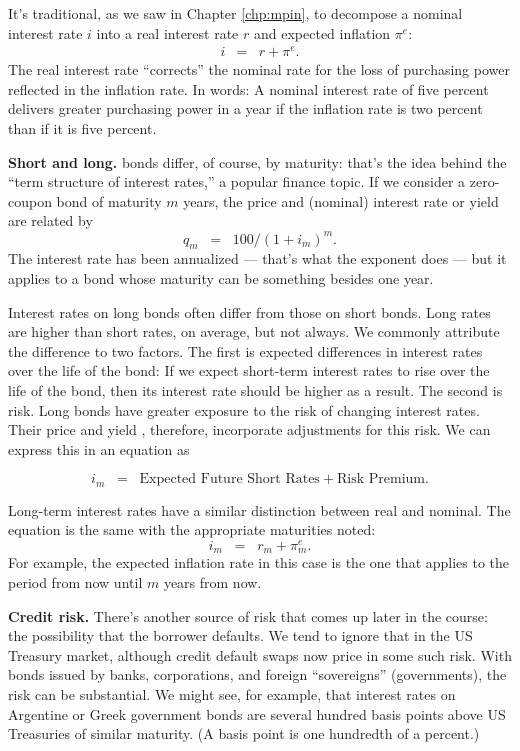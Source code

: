 It's traditional, as we saw in Chapter \ref{chp:mpin},
to decompose a nominal interest rate
 $i$
into a real interest rate
 $r$
and expected inflation $\pi^e$:
%
\begin{eqnarray}
    i &=& r + \pi^e .
    \label{eq:fisher}%
\end{eqnarray}
%
The real interest rate
``corrects'' the nominal rate for the loss of purchasing power
reflected in the inflation rate.
In words:  A nominal interest rate of five percent
delivers greater purchasing power in a year
if the inflation rate is two percent than if it is five percent.

\textbf{Short and long.}
bonds  differ, of course, by maturity:  that's
the idea behind the ``term structure of interest rates,''
a popular finance topic.
If we consider a zero-coupon bond  of maturity $m$ years,
the price and (nominal) interest rate or yield 
 are related by
\[
    q_m \;\;=\;\;  100/(1+i_m)^m .
\]
The interest rate has been annualized --- that's what the exponent does --- but it applies
to a bond  whose maturity can be something besides one year.


Interest rates on long bonds often differ from those on short bonds. 
Long rates are higher than short rates, on average,
but not always.
We commonly attribute the difference to two factors.
The first is expected differences in interest rates over the life of the bond:
If we expect short-term interest rates to rise over the life
of the bond, then its interest rate should be higher
as a result.
The second is risk.
Long bonds  have greater exposure to the risk of changing interest rates.
Their price and yield , therefore, incorporate adjustments for this risk.
We can express this in an equation as 

\[
    i_m \;\;=\;\; \mbox{Expected Future Short Rates}
                  +  \mbox{Risk Premium} .
\]

Long-term interest rates have a similar distinction between real and nominal. 
The equation is the same with the appropriate maturities noted:
\[
    i_m \;\;=\;\; r_m + \pi_m^e .
\]
For example, the expected inflation rate in this case is the one
that applies to the period from now until $m$ years from now.

\textbf{Credit risk. } There's another source of risk
that comes up later in the course:
the possibility that the borrower defaults.
We tend to ignore that in the US Treasury market, although
credit default swaps now price in some such risk.
With bonds  issued by banks, corporations, and foreign ``sovereigns''
(governments), the risk can be substantial.
We might see, for example, that interest rates on Argentine or Greek
government bonds  are several hundred basis points above US Treasuries
of similar maturity.
(A basis point is one hundredth of a percent.)


